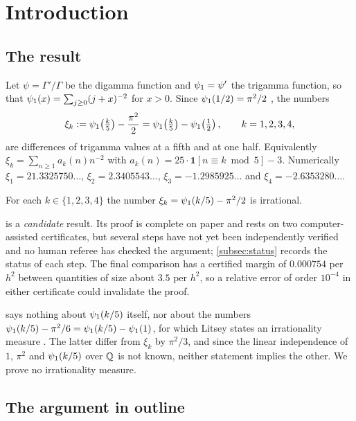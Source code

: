 \section{Introduction}\label{sec:introduction}

\subsection{The result}\label{subsec:result}

Let $\psi=\Gamma'/\Gamma$ be the digamma function and $\psi_1=\psi'$ the trigamma function, so
that $\psi_1(x)=\sum_{j\ge0}(j+x)^{-2}$ for $x>0$. Since $\psi_1(1/2)=\pi^2/2$
\cite[5.15.3]{DLMF}, the numbers
\begin{equation}\label{eq:xi-def}
  \xi_k:=\psi_1\!\left(\tfrac k5\right)-\frac{\pi^2}{2}
       =\psi_1\!\left(\tfrac k5\right)-\psi_1\!\left(\tfrac12\right),\qquad k=1,2,3,4,
\end{equation}
are differences of trigamma values at a fifth and at one half. Equivalently
$\xi_k=\sum_{n\ge1}a_k(n)n^{-2}$ with $a_k(n)=25\cdot\mathbf 1[n\equiv k\bmod 5]-3$. Numerically
$\xi_1=21.3325750\ldots$, $\xi_2=2.3405543\ldots$, $\xi_3=-1.2985925\ldots$ and
$\xi_4=-2.6353280\ldots$.

\begin{theorem}\label{thm:main}
For each $k\in\{1,2,3,4\}$ the number $\xi_k=\psi_1(k/5)-\pi^2/2$ is irrational.
\end{theorem}

 is a \emph{candidate} result. Its proof is complete on paper and rests on two
computer-assisted certificates, but several steps have not yet been independently verified and
no human referee has checked the argument; \cref{subsec:status} records the status of each step.
The final comparison has a certified margin of $0.000754$ per $h^2$ between quantities of size
about $3.5$ per $h^2$, so a relative error of order $10^{-4}$ in either certificate could
invalidate the proof.

 says nothing about $\psi_1(k/5)$ itself, nor about the numbers
$\psi_1(k/5)-\pi^2/6=\psi_1(k/5)-\psi_1(1)$, for which Litsey states an irrationality measure
\cite[Theorem~1.6(ii)]{Litsey2026Lowner}. The latter differ from $\xi_k$ by $\pi^2/3$, and since
the linear independence of $1$, $\pi^2$ and $\psi_1(k/5)$ over $\mathbb{Q}$ is not known, neither statement
implies the other. We prove no irrationality measure.

\subsection{The argument in outline}\label{subsec:one-page}


